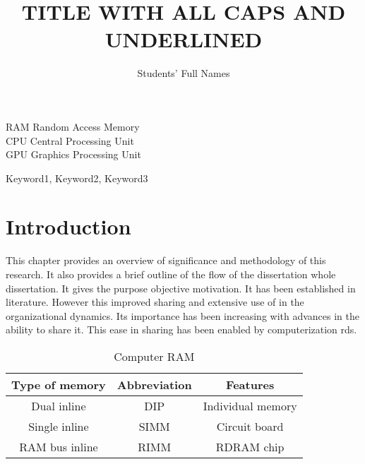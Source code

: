\documentclass{bscs}
\title{TITLE WITH ALL CAPS AND UNDERLINED}
\author{Students' Full Names}
\begin{document}
\frontmatter
\maketitle

\begin{acknowledgement}
    \lipsum[2-4] 
\end{acknowledgement}

\tableofcontents
\listoftables
{}
\listoffigures
{}
\begin{abbreviations}
    RAM \> Random Access Memory \\
    CPU \> Central Processing Unit \\
    GPU \> Graphics Processing Unit \\
\end{abbreviations}
\begin{abstract}
\lipsum[2-4]    
\end{abstract}

\begin{keywords}
    Keyword1, Keyword2, Keyword3
\end{keywords}


\mainmatter
\chapter{Introduction}
This chapter provides an overview of significance and methodology of this research. It also provides a brief outline of the flow of the dissertation whole dissertation. It gives the purpose objective motivation. It has been established in literature. However this improved sharing and extensive use of in the organizational dynamics. Its importance has been increasing with advances in the ability to share it. This ease in sharing has been enabled by computerization rds.

\begin{table}[h]
    \centering
    \begin{tabular}{|c|c|c|}
        \hline
        Type of memory & Abbreviation & Features \\
        \hline
        Dual inline & DIP & Individual memory \\
        Single inline & SIMM & Circuit board \\
        RAM bus inline & RIMM & RDRAM chip \\
        \hline
    \end{tabular}
    \caption{Computer RAM}
\end{table}
\end{document}
